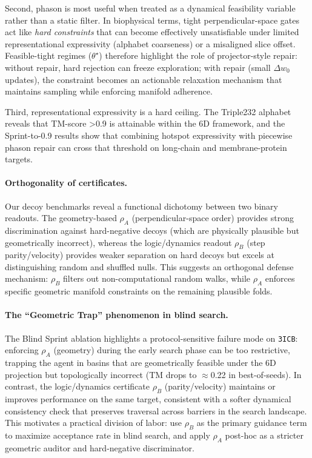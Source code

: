 Second, phason is most useful when treated as a dynamical feasibility variable rather than a static filter. In biophysical terms, tight perpendicular-space gates act like \emph{hard constraints} that can become effectively unsatisfiable under limited representational expressivity (alphabet coarseness) or a misaligned slice offset. Feasible-tight regimes ($\theta^\star$) therefore highlight the role of projector-style repair: without repair, hard rejection can freeze exploration; with repair (small $\Delta w_0$ updates), the constraint becomes an actionable relaxation mechanism that maintains sampling while enforcing manifold adherence.

Third, representational expressivity is a hard ceiling. The Triple232 alphabet reveals that TM-score >0.9 is attainable within the 6D framework, and the Sprint-to-0.9 results show that combining hotspot expressivity with piecewise phason repair can cross that threshold on long-chain and membrane-protein targets.

\paragraph{Orthogonality of certificates.}
Our decoy benchmarks reveal a functional dichotomy between two binary readouts. The geometry-based $\rho_A$ (perpendicular-space order) provides strong discrimination against hard-negative decoys (which are physically plausible but geometrically incorrect), whereas the logic/dynamics readout $\rho_B$ (step parity/velocity) provides weaker separation on hard decoys but excels at distinguishing random and shuffled nulls. This suggests an orthogonal defense mechanism: $\rho_B$ filters out non-computational random walks, while $\rho_A$ enforces specific geometric manifold constraints on the remaining plausible folds.

\paragraph{The ``Geometric Trap'' phenomenon in blind search.}
The Blind Sprint ablation highlights a protocol-sensitive failure mode on \texttt{3ICB}: enforcing $\rho_A$ (geometry) during the early search phase can be too restrictive, trapping the agent in basins that are geometrically feasible under the 6D projection but topologically incorrect (TM drops to $\approx$0.22 in best-of-seeds). In contrast, the logic/dynamics certificate $\rho_B$ (parity/velocity) maintains or improves performance on the same target, consistent with a softer dynamical consistency check that preserves traversal across barriers in the search landscape. This motivates a practical division of labor: use $\rho_B$ as the primary guidance term to maximize acceptance rate in blind search, and apply $\rho_A$ post-hoc as a stricter geometric auditor and hard-negative discriminator.

